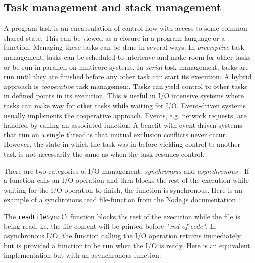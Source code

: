 
\subsection{Task management and stack management}
\label{sec:task-management}

A program task is an encapsulation of control flow with access to some common
shared state. This can be viewed as a closure in a program language or a
function. Managing these tasks can be done in several ways. In
\textit{preemptive} task management, tasks can be scheduled to interleave and
make room for other tasks or be run in parallell on multicore systems. In
\textit{serial} task management, tasks are run until they are finished before
any other task can start its execution. A hybrid approach is
\textit{cooperative} task management. Tasks can yield control to other tasks in
defined points in its execution. This is useful in I/O intensive systems where
tasks can make way for other tasks while waiting for I/O. Event-driven systems
usually implements the cooperative approach. Events, e.g.  network requests,
are handled by calling an associated function. A benefit with event-driven
systems that run on a single thread is that mutual exclusion conflicts never
occur. However, the state in which the task was in before yielding control to
another task is not necessarily the same as when the task resumes control.
\cite{adya2002cooperative}

There are two categories of I/O management: \textit{synchronous} and
\textit{asynchronous} \cite{adya2002cooperative}. If a function calls an I/O
operation and then blocks the rest of the execution while waiting for the I/O
operation to finish, the function is synchronous. Here is an example of a
synchronous read file-function from the Node.js documentation
\cite{nodejs-docs}:



The \lstinline{readFileSync()} function blocks the rest of the execution while
the file is being read, i.e. the file content will be printed before
\textit{"end of code"}. In asynchronous I/O, the function calling the I/O
operation returns immediately but is provided a function to be run when the I/O
is ready. Here is an equivalent implementation but with an asynchronous
function:

